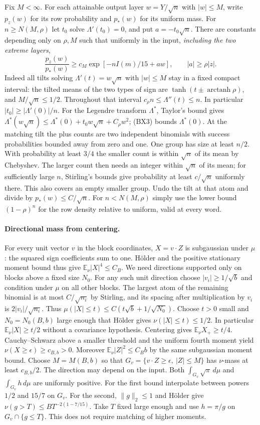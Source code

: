 Fix $M<\infty$. For each attainable output layer $w=Y/\sqrt n$ with
$|w|\le M$, write $p_z(w)$ for its row probability and $p_*(w)$ for its
uniform mass. For $n\ge N(M,\rho)$ let $t_0$ solve $\Lambda'(t_0)=0$,
and put $a=-t_0\sqrt n$. There are constants depending only on $\rho,M$
such that uniformly in the input, \emph{including the two extreme layers},
\[
 \frac{p_z(w)}{p_*(w)}\ge c_M\exp[-nI(m)/15+a w],
       \qquad |a|\ge\rho |z|.                                \tag{BX4}
\]
Indeed all tilts solving $\Lambda'(t)=w\sqrt n$ with $|w|\le M$ stay
in a fixed compact interval: the tilted means of the two types of sign are
$\tanh(t\pm\operatorname{arctanh}\rho)$, and $M/\sqrt n\le1/2$.
Throughout that interval $c_\rho n\le\Lambda''(t)\le n$.
In particular $|t_0|\ge|\Lambda'(0)|/n$. For the Legendre transform
$\Lambda^*$, Taylor's bound gives
$\Lambda^*(w\sqrt n)\le\Lambda^*(0)+t_0w\sqrt n+C_\rho w^2$;
(BX3) bounds $\Lambda^*(0)$. At the matching tilt the plus counts are
two independent binomials with success probabilities bounded away from
zero and one. One group has size at least $n/2$. With probability at
least $3/4$ the smaller count is within $\sqrt n$ of its mean by
Chebyshev. The larger count then needs an integer within $\sqrt n$ of
its mean; for sufficiently large $n$, Stirling's bounds give probability
at least $c/\sqrt n$ uniformly there. This also covers an empty smaller
group. Undo the tilt at that atom and divide by $p_*(w)\le C/\sqrt n$.
For $n<N(M,\rho)$ simply use the lower bound $(1-\rho)^n$ for the
row density relative to uniform, valid at every word.

\paragraph{Directional mass from centering.}
For every unit vector $v$ in the block coordinates, $X=v\cdot Z$
is subgaussian under $\mu$: the squared sign coefficients sum to one.
H\"older and the positive stationary moment bound thus give
$\mathbb E_\nu |X|^4\le C_B$. We need directions supported only on blocks above a fixed size $N_0$.
For any such unit direction choose $|v_i|\ge1/\sqrt b$ and condition under
$\mu$ on all other blocks. The largest atom of the remaining binomial is
at most $C/\sqrt{n_i}$ by Stirling, and its spacing after multiplication
by $v_i$ is $2|v_i|/\sqrt{n_i}$. Thus
$\mu(|X|\le t)\le C(t\sqrt b+1/\sqrt{N_0})$. Choose $t>0$ small and
$N_0=N_0(B,b)$ large enough that H\"older gives $\nu(|X|\le t)\le1/2$.
In particular $\mathbb E_\nu |X|\ge t/2$ without a covariance hypothesis.
Centering gives $\mathbb E_\nu X_+\ge t/4$. Cauchy--Schwarz above a
smaller threshold and the uniform fourth moment yield
$\nu(X\ge\epsilon)\ge c_{B,b}>0$. Moreover
$\mathbb E_\nu |Z|^2\le C_B b$ by the same subgaussian moment bound.
Choose $M=M(B,b)$ so that $G_v=\{v\cdot Z\ge\epsilon,\ |Z|\le M\}$
has $\nu$-mass at least $c_{B,b}/2$. The direction may depend on the input.
Both $\int_{G_v}\sqrt\pi\,d\mu$ and $\int_{G_v}h\,d\mu$ are uniformly
positive. For the first bound interpolate between powers
$1/2$ and $15/7$ on $G_v$. For the second, $\|g\|_2\le1$ and H\"older give
$\nu(g>T)\le B T^{-2(1-7/15)}$. Take $T$ fixed large enough and use
$h=\pi/g$ on $G_v\cap\{g\le T\}$. This does not require matching of
higher moments.

